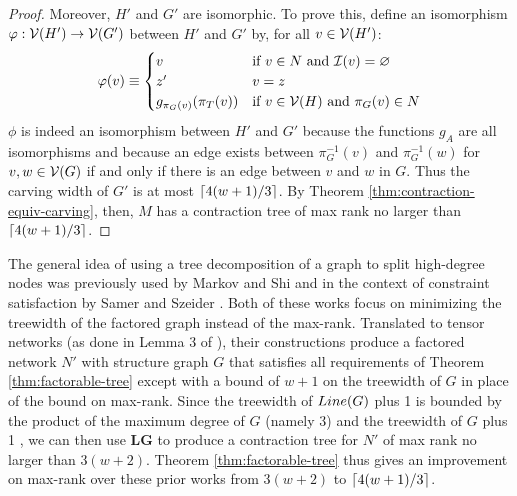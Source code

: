 \begin{proof}
Moreover, $H'$ and $G'$ are isomorphic. To prove this, define an isomorphism $\varphi: \mathcal{V}(H') \rightarrow \mathcal{V}(G')$ between $H'$ and $G'$ by, for all $v \in \mathcal{V}(H')$:
$$\varphi(v) \equiv \begin{cases}v&\text{if}~v \in N~\text{and}~\mathcal{I}(v)=\varnothing\\z'&v=z\\g_{\pi_G(v)}(\pi_T(v))&\text{if}~v \in \mathcal{V}(H)~\text{and}~\pi_G(v) \in N\end{cases}$$
$\phi$ is indeed an isomorphism between $H'$ and $G'$ because the functions $g_A$ are all isomorphisms and because an edge exists between $\pi_G^{-1}(v)$ and $\pi_G^{-1}(w)$ for $v, w \in \mathcal{V}(G)$ if and only if there is an edge between $v$ and $w$ in $G$. Thus the carving width of $G'$ is at most $\lceil4(w+1)/3\rceil$. By Theorem \ref{thm:contraction-equiv-carving}, then, $M$ has a contraction tree of max rank no larger than $\lceil4(w+1)/3\rceil$.
\end{proof}

The general idea of using a tree decomposition of a graph to split high-degree nodes was previously used by Markov and Shi \cite{MS11} and in the context of constraint satisfaction by Samer and Szeider \cite{SS10_2}. Both of these works focus on minimizing the treewidth of the factored graph instead of the max-rank. Translated to tensor networks (as done in Lemma 3 of \cite{oliveira18}), their constructions produce a factored network $N'$ with structure graph $G$ that satisfies all requirements of Theorem \ref{thm:factorable-tree} except with a bound of $w+1$ on the treewidth of $G$ in place of the bound on max-rank. Since the treewidth of $Line(G)$ plus 1 is bounded by the product of the maximum degree of $G$ (namely 3) and the treewidth of $G$ plus 1 \cite{MS08}, we can then use \textbf{LG} to produce a contraction tree for $N'$ of max rank no larger than $3(w+2)$. Theorem \ref{thm:factorable-tree} thus gives an improvement on max-rank over these prior works from $3(w+2)$ to $\lceil4(w+1)/3\rceil$.


